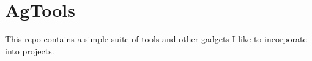 \chapter{Ag\+Tools}
\hypertarget{md__source_2readme}{}\label{md__source_2readme}
\label{md__source_2readme_autotoc_md0}%
%
 This repo contains a simple suite of tools and other gadgets I like to incorporate into projects. 